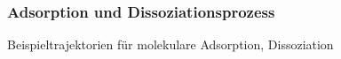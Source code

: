 \documentclass[hyperref={pdfpagelabels=false}]{beamer}
\begin{document}
\begin{frame}
 \frametitle{Adsorption und Dissoziationsprozess}
 Beispieltrajektorien für molekulare Adsorption, Dissoziation
 \begin{columns}
  \begin{figure}[h!]
  \centering
\end{figure}
\begin{figure}
\flushleft

\end{figure}
\end{columns}
\end{frame}
\end{document}
